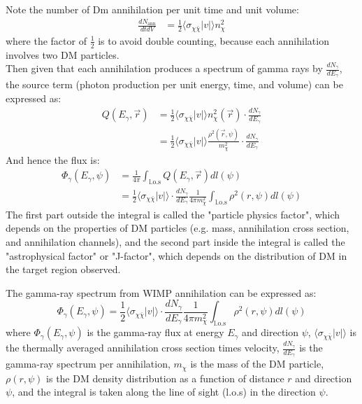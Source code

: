 \bigskip \noindent
\begin{foundation}
    Note the number of Dm annihilation per unit time and unit volume:
    \begin{align*}
        \frac{d N_\text{ann}}{dt dV} &= \frac{1}{2} \langle \sigma_{\chi \bar{\chi}} |v| \rangle n_\chi^2
    \end{align*}
    where the factor of $\frac{1}{2}$ is to avoid double counting, because each annihilation involves two DM particles. \\

    Then given that each annihilation produces a spectrum of gamma rays by $\frac{dN_\gamma}{dE_\gamma}$, the source term (photon production per unit energy, time, and volume) can be expressed as:
    \begin{align*}
        Q(E_\gamma, \vec{r}) &= \frac{1}{2} \langle \sigma_{\chi \bar{\chi}} |v| \rangle n_\chi^2(\vec{r}) \cdot \frac{dN_\gamma}{dE_\gamma} \\
        &= \frac{1}{2} \langle \sigma_{\chi \bar{\chi}} |v| \rangle \frac{\rho^2(\vec{r}, \psi)}{m_\chi^2} \cdot \frac{dN_\gamma}{dE_\gamma}
    \end{align*}
    And hence the flux is:
    \begin{align*}
        \Phi_\gamma(E_\gamma, \psi) &= \frac{1}{4 \pi} \int_{\text{l.o.s}} Q(E_\gamma, \vec{r}) dl(\psi) \\
        &= \frac{1}{2} \langle \sigma_{\chi \bar{\chi}} |v| \rangle \cdot \frac{dN_\gamma}{dE_\gamma} \frac{1}{4\pi m_\chi^2} \int_{\text{l.o.s}} \rho^2(r, \psi) dl(\psi)
    \end{align*}
    The first part outside the integral is called the "particle physics factor", which depends on the properties of DM particles (e.g. mass, annihilation cross section, and annihilation channels), and the second part inside the integral is called the "astrophysical factor" or "J-factor", which depends on the distribution of DM in the target region observed.
\end{foundation} 

\bigskip \noindent
\begin{theory}
    The gamma-ray spectrum from WIMP annihilation can be expressed as:
    \[
        \Phi_\gamma(E_\gamma, \psi) = \frac{1}{2} \langle \sigma_{\chi \bar{\chi}} |v| \rangle \cdot \frac{dN_\gamma}{dE_\gamma} \frac{1}{4\pi m_\chi^2} \int_{\text{l.o.s}} \rho^2(r, \psi) dl(\psi)
    \]
    where $\Phi_\gamma(E_\gamma, \psi)$ is the gamma-ray flux at energy $E_\gamma$ and direction $\psi$, $\langle \sigma_{\chi \bar{\chi}} |v| \rangle$ is the thermally averaged annihilation cross section times velocity, $\frac{dN_\gamma}{dE_\gamma}$ is the gamma-ray spectrum per annihilation, $m_\chi$ is the mass of the DM particle, $\rho(r, \psi)$ is the DM density distribution as a function of distance $r$ and direction $\psi$, and the integral is taken along the line of sight (l.o.s) in the direction $\psi$.
\end{theory}

